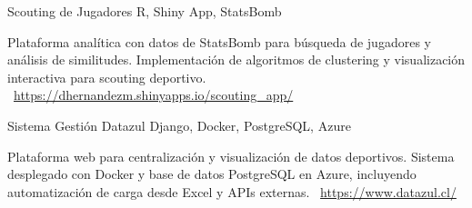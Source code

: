 \documentclass[]{awesome-cv}
\begin{document}
\begin{cventries}
	\vspace{-3mm}
	\cventry
	{}
	{Scouting de Jugadores \vspace{-5mm}}
	{R, Shiny App, StatsBomb \vspace{-5mm}}
	{}
	{\begin{cvsectionnormaltext}
		\item {Plataforma analítica con datos de StatsBomb para búsqueda de jugadores y análisis de similitudes. Implementación de algoritmos de clustering y visualización interactiva para scouting deportivo.
		\newline \faLink\ \href{https://dhernandezm.shinyapps.io/scouting_app/}{https://dhernandezm.shinyapps.io/scouting\_app/}}
	\end{cvsectionnormaltext}}

	\vspace{-3mm}
	\cventry
	{}
	{Sistema Gestión Datazul \vspace{-5mm}}
	{Django, Docker, PostgreSQL, Azure \vspace{-5mm}}
	{}
	{\begin{cvsectionnormaltext}
		\item {Plataforma web para centralización y visualización de datos deportivos. Sistema desplegado con Docker y base de datos PostgreSQL en Azure, incluyendo automatización de carga desde Excel y APIs externas.
		\newline \faLink\ \href{https://www.datazul.cl/}{https://www.datazul.cl/}}
	\end{cvsectionnormaltext}}
	
	\vspace{-5mm}
	
\end{cventries}
\end{document}
